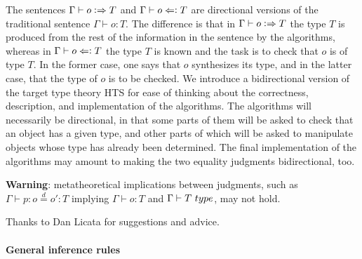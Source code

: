 \documentclass[11pt]{article}
\newcommand{\eqd}{\stackrel{d}{=}}
\newcommand{\synth}{\vcentcolon\Rightarrow}
\newcommand{\force}{\Leftarrow\vcentcolon}
\newcommand{\Type}{\mathop{{\, \sc type}}}
\begin{document}
The sentences $\Gamma\vdash o \synth T$ and $\Gamma\vdash o \force T$ are
directional versions of the traditional sentence $\Gamma\vdash o : T$.  The
difference is that in $\Gamma\vdash o \synth T$ the type $T$ is produced from
the rest of the information in the sentence by the algorithms, whereas in
$\Gamma\vdash o \force T$ the type $T$ is known and the task is to check that
$o$ is of type $T$.  In the former case, one says that $o$ synthesizes its
type, and in the latter case, that the type of $o$ is to be checked.  We
introduce a bidirectional version of the target type theory HTS for ease of
thinking about the correctness, description, and implementation of the
algorithms.  The algorithms will necessarily be directional, in that some parts
of them will be asked to check that an object has a given type, and other parts
of which will be asked to manipulate objects whose type has already been
determined.  The final implementation of the algorithms may amount to making
the two equality judgments bidirectional, too.

{\bf Warning}: metatheoretical implications between judgments, such as $\Gamma
\vdash p : o \eqd o' : T$ implying $\Gamma \vdash o : T$ and $\Gamma \vdash T
\Type$, may not hold.

Thanks to Dan Licata for suggestions and advice.

\paragraph{General inference rules} 
\end{document}
